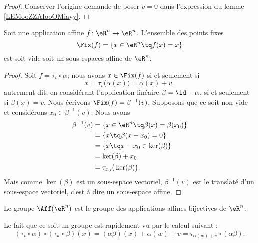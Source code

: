 \begin{proof}
    Conserver l'origine demande de poser \( v=0\) dans l'expression du lemme \ref{LEMooZZAIooOMiayy}.
\end{proof}

\begin{proposition}     \label{PROPooYRCJooIcmUVI}
    Soit une application affine \( f\colon \eR^n\to \eR^n\). L'ensemble des points fixes 
    \begin{equation}
        \Fix(f)=\{ x\in \eR^n\tq f(x)=x \}
    \end{equation}
    est soit vide soit un sous-espaces affine de \( \eR^n\).
\end{proposition}

\begin{proof}
    Soit \( f=\tau_v\circ \alpha\); nous avons \( x\in\Fix(f)\) si et seulement si
    \begin{equation}
        x=\tau_v\big( \alpha(x) \big)=\alpha(x)+v,
    \end{equation}
    autrement dit, en considérant l'application linéaire \( \beta=\id-\alpha\), si et seulement si \( \beta(x)=v\). Nous écrivons \( \Fix(f)=\beta^{-1}(v)\). Supposons que ce soit non vide et considérons \( x_0\in\beta^{-1}(v)\). Nous avons
    \begin{subequations}
        \begin{align}
            \beta^{-1}(v)&=\{ x\in \eR^n\tq \beta(x)=\beta(x_0) \}\\
            &=\{ x\tq \beta(x-x_0)=0 \}\\
            &=\{ x\tq x-x_0\in \ker(\beta) \}\\
            &=\ker(\beta)+x_0\\
            &=\tau_{x_0}\big( \ker(\beta) \big).
        \end{align}
    \end{subequations}
    Mais comme \( \ker(\beta)\) est un sous-espace vectoriel, \( \beta^{-1}(v)\) est le translaté d'un sous-espace vectoriel, c'est à dire un sous-espace affine.
\end{proof}

\begin{definition}
    Le groupe \( \Aff(\eR^n)\) est le groupe des applications affines bijectives de \( \eR^n\).
\end{definition}

\begin{remark}
    Le fait que ce soit un groupe est rapidement vu par le calcul suivant :
    \begin{equation}
        (\tau_v\circ\alpha)\circ(\tau_w\circ\beta)(x)=(\alpha\beta)(x)+\alpha(w)+v=\tau_{\alpha(w)+v}\circ(\alpha\beta).
    \end{equation}
\end{remark}

